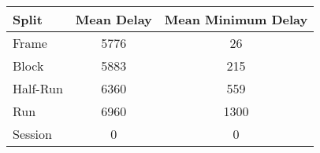 
\begin{tabular}{l*{2}{c}}
\toprule
Split & Mean Delay & Mean Minimum Delay \\
\midrule
Frame & 5776 & 26 \\
Block & 5883 & 215 \\
Half-Run & 6360 & 559 \\
Run & 6960 & 1300 \\
Session & 0 & 0 \\
\bottomrule 
\end{tabular}
